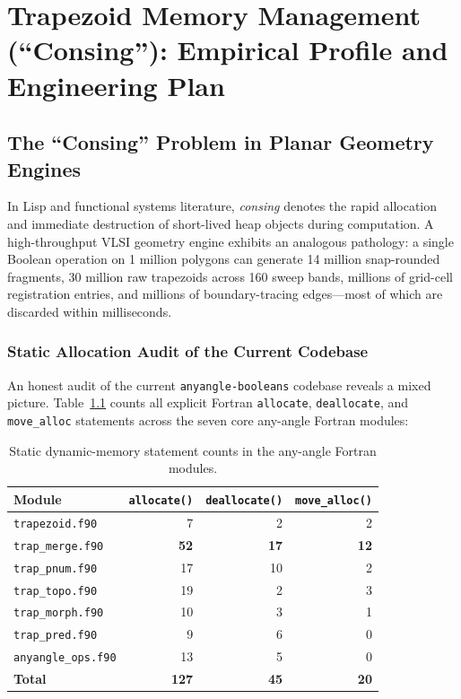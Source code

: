 \chapter{Trapezoid Memory Management (``Consing''): Empirical Profile and Engineering Plan}
\label{ch:memory}

\section{The ``Consing'' Problem in Planar Geometry Engines}

In Lisp and functional systems literature, \emph{consing} denotes the rapid allocation and immediate destruction of short-lived heap objects during computation. A high-throughput VLSI geometry engine exhibits an analogous pathology: a single Boolean operation on 1 million polygons can generate 14 million snap-rounded fragments, 30 million raw trapezoids across 160 sweep bands, millions of grid-cell registration entries, and millions of boundary-tracing edges---most of which are discarded within milliseconds.

\subsection{Static Allocation Audit of the Current Codebase}

An honest audit of the current \texttt{anyangle-booleans} codebase reveals a mixed picture. Table~\ref{tab:static_alloc} counts all explicit Fortran \texttt{allocate}, \texttt{deallocate}, and \texttt{move\_alloc} statements across the seven core any-angle Fortran modules:

\begin{table}[htbp]
\centering
\caption{Static dynamic-memory statement counts in the any-angle Fortran modules.}
\label{tab:static_alloc}
\small
\begin{tabular}{@{}lrrr@{}}
\toprule
\textbf{Module} & \texttt{allocate()} & \texttt{deallocate()} & \texttt{move\_alloc()} \\
\midrule
\texttt{trapezoid.f90} & 7 & 2 & 2 \\
\texttt{trap\_merge.f90} & \textbf{52} & \textbf{17} & \textbf{12} \\
\texttt{trap\_pnum.f90} & 17 & 10 & 2 \\
\texttt{trap\_topo.f90} & 19 & 2 & 3 \\
\texttt{trap\_morph.f90} & 10 & 3 & 1 \\
\texttt{trap\_pred.f90} & 9 & 6 & 0 \\
\texttt{anyangle\_ops.f90} & 13 & 5 & 0 \\
\midrule
\textbf{Total} & \textbf{127} & \textbf{45} & \textbf{20} \\
\bottomrule
\end{tabular}
\end{table}

